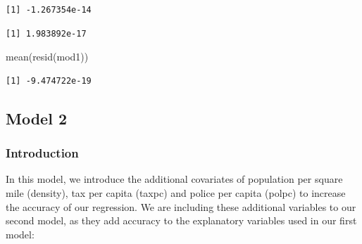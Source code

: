\documentclass[]{article}
\newenvironment{Shaded}{}{}
\newcommand{\KeywordTok}[1]{\textcolor[rgb]{0.00,0.00,1.00}{#1}}
\newcommand{\NormalTok}[1]{#1}
\newcommand{\OperatorTok}[1]{#1}
\begin{document}
\begin{verbatim}
[1] -1.267354e-14
\end{verbatim}

\begin{Shaded}
\end{Shaded}

\begin{verbatim}
[1] 1.983892e-17
\end{verbatim}

\begin{Shaded}
\begin{Highlighting}[]
\KeywordTok{mean}\NormalTok{(}\KeywordTok{resid}\NormalTok{(mod1))}
\end{Highlighting}
\end{Shaded}

\begin{verbatim}
[1] -9.474722e-19
\end{verbatim}

\hypertarget{model-2}{%
\subsection{Model 2}\label{model-2}}

\hypertarget{introduction-2}{%
\subsubsection{Introduction}\label{introduction-2}}

In this model, we introduce the additional covariates of population per
square mile (density), tax per capita (taxpc) and police per capita
(polpc) to increase the accuracy of our regression. We are including
these additional variables to our second model, as they add accuracy to
the explanatory variables used in our first model:
\end{document}
